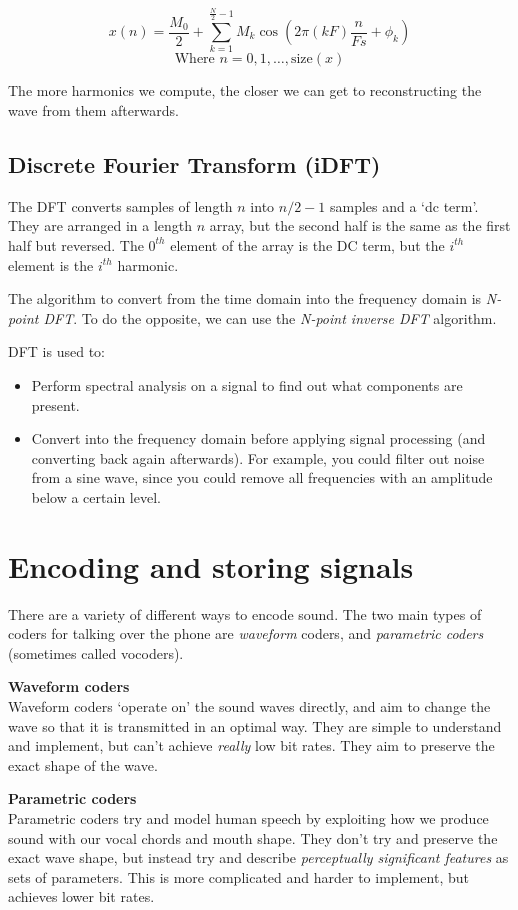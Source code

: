 \[
  x(n) = \frac{M_0}{2} + \sum\limits^{\frac{N}{2}-1}_{k=1}M_k\cos\left(2\pi (kF)\frac{n}{Fs} + \phi_k\right)
\]
\[
  \text{Where } n = 0,1,\dots,\text{size}(x)
\]

The more harmonics we compute, the closer we can get to reconstructing the wave
from them afterwards.

\subsection{Discrete Fourier Transform (iDFT)}

The DFT converts samples of length $n$ into $n/2 - 1$ samples and a `dc term'.
They are arranged in a length $n$ array, but the second half is the same as the
first half but reversed. The $0^{th}$ element of the array is the DC term, but
the $i^{th}$ element is the $i^{th}$ harmonic. 

The algorithm to convert from the time domain into the frequency domain is
\textit{N-point DFT}. To do the opposite, we can use the \textit{N-point inverse
DFT} algorithm.

DFT is used to:

\begin{itemize}
  \item Perform spectral analysis on a signal to find out what components are 
    present.
  \item Convert into the frequency domain before applying signal processing (and
    converting back again afterwards). For example, you could filter out noise 
    from a sine wave, since you could remove all frequencies with an amplitude
    below a certain level.
\end{itemize}


\section{Encoding and storing signals}

There are a variety of different ways to encode sound. The two main types of
coders for talking over the phone are \textit{waveform} coders, and
\textit{parametric coders} (sometimes called vocoders).

\begin{description}
  \item \textbf{Waveform coders}\\
  Waveform coders `operate on' the sound waves directly, and aim to change the
  wave so that it is transmitted in an optimal way. They are simple to
  understand and implement, but can't achieve \textit{really} low bit rates.
  They aim to preserve the exact shape of the wave.

  \item \textbf{Parametric coders}\\
  Parametric coders try and model human speech by exploiting how we produce
  sound with our vocal chords and mouth shape. They don't try and preserve the
  exact wave shape, but instead try and describe \textit{perceptually
  significant features} as sets of parameters. This is more complicated and
  harder to implement, but achieves lower bit rates.
\end{description}

